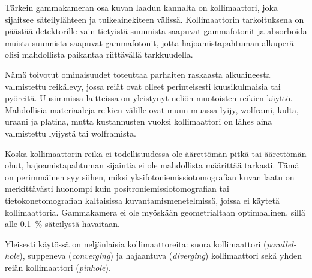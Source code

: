 Tärkein gammakameran osa kuvan laadun kannalta on kollimaattori, joka sijaitsee säteilylähteen ja tuikeainekiteen välissä. Kollimaattorin tarkoituksena on päästää detektorille vain tietyistä suunnista saapuvat gammafotonit ja absorboida muista suunnista saapuvat gammafotonit, jotta hajoamistapahtuman alkuperä olisi mahdollista paikantaa riittävällä tarkkuudella.\cite{cherry_gamma_2012, slomka_novel_2022}

Nämä toivotut ominaisuudet toteuttaa parhaiten raskaasta alkuaineesta valmistettu reikälevy, jossa reiät ovat olleet perinteisesti kuusikulmaisia tai pyöreitä.\cite{van_audenhaege_review_2015, cherry_gamma_2012} Uusimmissa laitteissa on yleistynyt neliön muotoisten reikien käyttö\cite{ljungberg_spectct_2018, slomka_novel_2022}. Mahdollisia materiaaleja reikien välille ovat muun muassa lyijy, wolframi, kulta, uraani ja platina\cite{van_audenhaege_review_2015}, mutta kustannusten vuoksi\cite{van_audenhaege_review_2015} kollimaattori on lähes aina valmistettu lyijystä tai wolframista.\cite{cherry_gamma_2012}

Koska kollimaattorin reikä ei todellisuudessa ole äärettömän pitkä tai äärettömän ohut, hajoamistapahtuman sijaintia ei ole mahdollista määrittää tarkasti. Tämä on perimmäinen syy siihen, miksi yksifotoniemissiotomografian kuvan laatu on merkittävästi huonompi kuin positroniemissiotomografian tai tietokonetomografian kaltaisissa kuvantamismenetelmissä, joissa ei käytetä kollimaattoria.\cite{cherry_gamma_2012} Gammakamera ei ole myöskään geometrialtaan optimaalinen, sillä alle \qty{0,1}{\percent} säteilystä havaitaan\cite{slomka_novel_2022}.
 
Yleisesti käytössä on neljänlaisia kollimaattoreita: suora kollimaattori (\textit{parallel-hole}), suppeneva (\textit{converging}) ja hajaantuva (\textit{diverging}) kollimaattori sekä yhden reiän kollimaattori (\textit{pinhole})\cite{cherry_gamma_2012, van_audenhaege_review_2015}.

